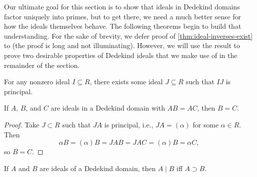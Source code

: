 Our ultimate goal for this section is to show that ideals in Dedekind domains factor uniquely into primes, but to get there, we need a much better sense for how the ideals themselves behave.
The following theorems begin to build that understanding. For the sake of brevity, we defer proof of \autoref{thm:ideal-inverses-exist} to \textcite[40]{marcus} (the proof is long and not illuminating). However, we will use the result to prove two desirable properties of Dedekind ideals that we make use of in the remainder of the section.

\begin{theorem}
    \label{thm:ideal-inverses-exist}
    For any nonzero ideal $I \subseteq R$, there exists some ideal $J \subseteq R$ such that $IJ$ is principal.
\end{theorem}

\begin{corollary}
    \label{thm:ideal-cancellation-law}
    If $A$, $B$, and $C$ are ideals in a Dedekind domain with $AB = AC$, then $B = C$.
\end{corollary}

\begin{proof}
    Take $J \subset R$ such that $JA$ is principal, i.e., $JA = (\alpha)$ for some $\alpha \in R$. Then
    \begin{equation}
        \alpha B
        = (\alpha) B
        = JAB
        = JAC
        = (\alpha) B
        = \alpha C,
    \end{equation}
    so $B = C$.
\end{proof}

\begin{corollary}
    \label{thm:ideal-divisibility}
    If $A$ and $B$ are ideals of a Dedekind domain, then $A \mid B$ iff $A \supset B$.
\end{corollary}

